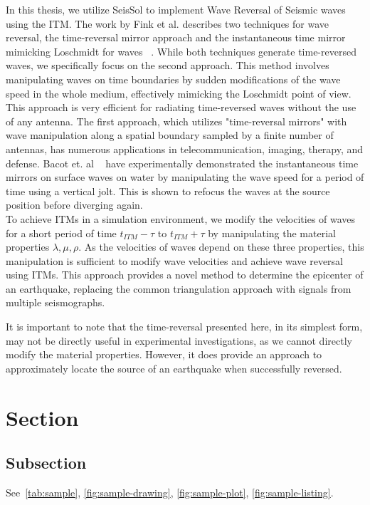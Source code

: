 In this thesis, we utilize SeisSol to implement Wave Reversal of Seismic waves using the \ac{ITM}. 
The work by Fink et al. describes two techniques for wave reversal, the time-reversal mirror approach and the instantaneous time mirror mimicking Loschmidt for waves ~\parencite{Fink2017}. 
While both techniques generate time-reversed waves, we specifically focus on the second approach. 
This method involves manipulating waves on time boundaries by sudden modifications of the wave speed in the whole medium, effectively mimicking the Loschmidt point of view. 
This approach is very efficient for radiating time-reversed waves without the use of any antenna. 
The first approach, which utilizes "time-reversal mirrors" with wave manipulation along a spatial boundary sampled by a finite number of antennas, has numerous applications in telecommunication, imaging, therapy, and defense.
Bacot et. al ~\parencite{Bacot2016} have experimentally demonstrated the instantaneous time mirrors on surface waves on water by manipulating the wave speed for a period of time using a vertical jolt.
This is shown to refocus the waves at the source position before diverging again.\\

To achieve \ac{ITM}s in a simulation environment, we modify the velocities of waves for a short period of time $t_{ITM} - \tau$ to $t_{ITM} + \tau$ by manipulating 
the material properties $\lambda, \mu, \rho$. As the velocities of waves depend on these three properties, this manipulation is 
sufficient to modify wave velocities and achieve wave reversal using \ac{ITM}s. This approach provides a novel method to determine 
the epicenter of an earthquake, replacing the common triangulation approach with signals from multiple seismographs.

It is important to note that the time-reversal presented here, in its simplest form, may not be directly useful in experimental 
investigations, as we cannot directly modify the material properties. However, it does provide an approach to approximately 
locate the source of an earthquake when successfully reversed.

\section{Section}
\subsection{Subsection}

See~\autoref{tab:sample}, \autoref{fig:sample-drawing}, \autoref{fig:sample-plot}, \autoref{fig:sample-listing}.

